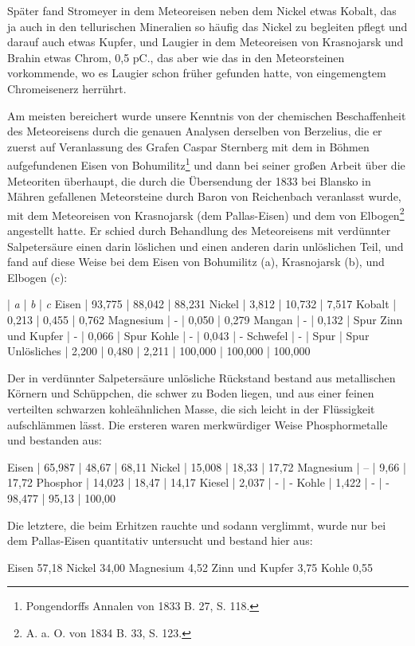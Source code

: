 \documentclass[a4paper, 11pt, oneside]{article}
\begin{document}
Später fand Stromeyer in dem Meteoreisen neben dem Nickel etwas Kobalt, das ja auch in den tellurischen Mineralien so häufig das Nickel zu begleiten pflegt und darauf auch etwas Kupfer, und Laugier in dem Meteoreisen von Krasnojarsk und Brahin etwas Chrom, 0,5 pC., das aber wie das in den Meteorsteinen vorkommende, wo es Laugier schon früher gefunden hatte, von eingemengtem Chromeisenerz herrührt.

Am meisten bereichert wurde unsere Kenntnis von der chemischen Beschaffenheit des Meteoreisens durch die genauen Analysen derselben von Berzelius, die er zuerst auf Veranlassung des Grafen Caspar Sternberg mit dem in Böhmen aufgefundenen Eisen von Bohumilitz\footnote{Pongendorffs Annalen von 1833 B. 27, S. 118.} und dann bei seiner großen Arbeit über die Meteoriten überhaupt, die durch die Übersendung der 1833 bei Blansko in Mähren gefallenen Meteorsteine durch Baron von Reichenbach veranlasst wurde, mit dem Meteoreisen von Krasnojarsk (dem Pallas-Eisen) und dem von Elbogen\footnote{A. a. O. von 1834 B. 33, S. 123.} angestellt hatte. Er schied durch Behandlung des Meteoreisens mit verdünnter Salpetersäure einen darin löslichen und einen anderen darin unlöslichen Teil, und fand auf diese Weise bei dem Eisen von Bohumilitz (a), Krasnojarsk (b), und Elbogen (c):

 | \emph{a} | \emph{b} | \emph{c}  
Eisen | 93,775 | 88,042 | 88,231  
Nickel | 3,812 | 10,732 | 7,517  
Kobalt | 0,213 | 0,455 | 0,762  
Magnesium | - | 0,050 | 0,279  
Mangan | - | 0,132 | Spur  
Zinn und Kupfer | - | 0,066 | Spur  
Kohle | - | 0,043 | -  
Schwefel | - | Spur | Spur  
Unlösliches | 2,200 | 0,480 | 2,211  
 | 100,000 | 100,000 | 100,000  

Der in verdünnter Salpetersäure unlösliche Rückstand bestand aus metallischen Körnern und Schüppchen, die schwer zu Boden liegen, und aus einer feinen verteilten schwarzen kohleähnlichen Masse, die sich leicht in der Flüssigkeit aufschlämmen lässt. Die ersteren waren merkwürdiger Weise Phosphormetalle und bestanden aus:

Eisen | 65,987 | 48,67 | 68,11  
Nickel | 15,008 | 18,33 | 17,72  
Magnesium | – | 9,66 | 17,72  
Phosphor | 14,023 | 18,47 | 14,17  
Kiesel | 2,037 | - | -  
Kohle | 1,422 | - | -  
98,477 | 95,13 | 100,00  

Die letztere, die beim Erhitzen rauchte und sodann verglimmt, wurde nur bei dem Pallas-Eisen quantitativ untersucht und bestand hier aus:

Eisen 57,18
Nickel 34,00
Magnesium 4,52
Zinn und Kupfer 3,75
Kohle 0,55
\end{document}
